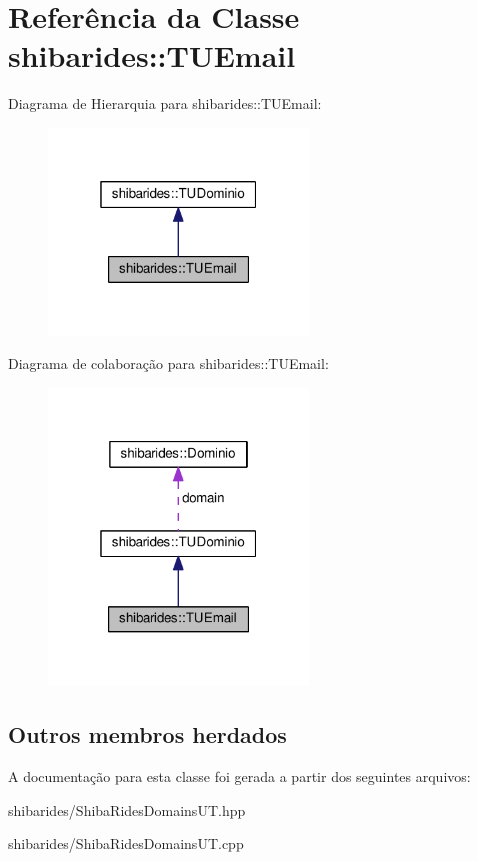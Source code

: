 \hypertarget{classshibarides_1_1TUEmail}{}\section{Referência da Classe shibarides\+:\+:T\+U\+Email}
\label{classshibarides_1_1TUEmail}


Diagrama de Hierarquia para shibarides\+:\+:T\+U\+Email\+:\nopagebreak
\begin{figure}[H]
\begin{center}
\leavevmode
\includegraphics[width=196pt]{classshibarides_1_1TUEmail__inherit__graph}
\end{center}
\end{figure}


Diagrama de colaboração para shibarides\+:\+:T\+U\+Email\+:\nopagebreak
\begin{figure}[H]
\begin{center}
\leavevmode
\includegraphics[width=196pt]{classshibarides_1_1TUEmail__coll__graph}
\end{center}
\end{figure}
\subsection*{Outros membros herdados}


A documentação para esta classe foi gerada a partir dos seguintes arquivos\+:\begin{DoxyCompactItemize}
\item 
shibarides/Shiba\+Rides\+Domains\+U\+T.\+hpp\item 
shibarides/Shiba\+Rides\+Domains\+U\+T.\+cpp\end{DoxyCompactItemize}
